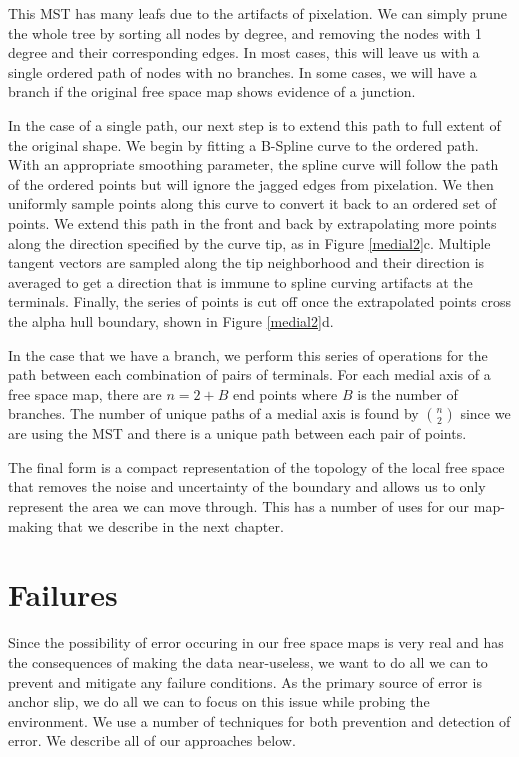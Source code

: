 This MST has many leafs due to the artifacts of pixelation.  We can simply prune the whole tree by sorting all nodes by degree, and removing the nodes with 1 degree and their corresponding edges.  In most cases, this will leave us with a single ordered path of nodes with no branches.  In some cases, we will have a branch if the original free space map shows evidence of a junction.

In the case of a single path, our next step is to extend this path to full extent of the original shape.  We begin by fitting a B-Spline curve to the ordered path.  With an appropriate smoothing parameter, the spline curve will follow the path of the ordered points but will ignore the jagged edges from pixelation.  We then uniformly sample points along this curve to convert it back to an ordered set of points.  We extend this path in the front and back by extrapolating more points along the direction specified by the curve tip, as in Figure \ref{medial2}c.  Multiple tangent vectors are sampled along the tip neighborhood and their direction is averaged to get a direction that is immune to spline curving artifacts at the terminals.  Finally, the series of points is cut off once the extrapolated points cross the alpha hull boundary, shown in Figure \ref{medial2}d.

In the case that we have a branch, we perform this series of operations for the path between each combination of pairs of terminals.  For each medial axis of a free space map, there are $n = 2 + B$ end points where $B$ is the number of branches.  The number of unique paths of a medial axis is found by ${n \choose 2}$ since we are using the MST and there is a unique path between each pair of points.

The final form is a compact representation of the topology of the local free space that removes the noise and uncertainty of the boundary and allows us to only represent the area we can move through.  This has a number of uses for our map-making that we describe in the next chapter.  


\section{Failures}

Since the possibility of error occuring in our free space maps is very real and has the consequences of making the data near-useless, we want to do all we can to prevent and mitigate any failure conditions.  As the primary source of error is anchor slip, we do all we can to focus on this issue while probing the environment.  We use a number of techniques for both prevention and detection of error.  We describe all of our approaches below.

